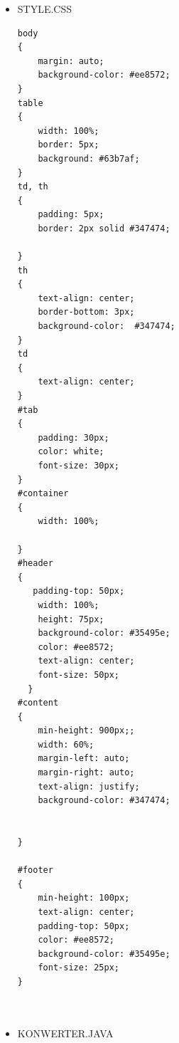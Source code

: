 \documentclass[12pt,a4paper]{article}
\begin{document}
\begin{itemize}
\begin{lstlisting}[language=Html]
                                            <td>0100010011110110</td>
                     <td>2014-7-22</td> 
                 </tr>
                 <tr>
                                            <td>0011000010010000</td>
                     <td>2004-4-16</td> 
                 </tr>
                 <tr>
                                            <td>0011001001001101</td>
                     <td>2005-2-13</td> 
                 </tr>
                 <tr>
                                            <td>0011110100011001</td>
                     <td>2010-8-25</td> 
                 </tr>
                 <tr>
                                            <td>0010110000101010</td>
                     <td>2002-1-10</td> 
                 </tr>
                 <tr>
                                            <td>0010110000101010</td>
                     <td>2002-1-10</td> 
                 </tr>
                </table>
            </div>
        <center><img src="wykres.png"></center>   </div> 
           <div id="footer"> 
                 Adam Kierat WI_DATY- Projekt Jezyki Skryptowe, 2019  
           </div> 
    </div> 
</body> 


	\end{lstlisting}
		\newpage
	\item STYLE.CSS
	\begin{lstlisting}
body
{
    margin: auto;
    background-color: #ee8572;
}
table
{
    width: 100%;
    border: 5px;
    background: #63b7af;
}
td, th
{
    padding: 5px;
    border: 2px solid #347474;

}
th
{
    text-align: center;
    border-bottom: 3px;
    background-color:  #347474;
}
td
{
    text-align: center;
}
#tab
{
    padding: 30px;
    color: white;
    font-size: 30px;
}
#container
{
    width: 100%;

}
#header
{
   padding-top: 50px;
    width: 100%;
    height: 75px;
    background-color: #35495e;
    color: #ee8572;
    text-align: center;
    font-size: 50px;
  }
#content
{
    min-height: 900px;;
    width: 60%;
    margin-left: auto;
    margin-right: auto;
    text-align: justify;
    background-color: #347474;


}

#footer
{
    min-height: 100px;
    text-align: center;
    padding-top: 50px;
    color: #ee8572;
    background-color: #35495e;
    font-size: 25px;
}



	\end{lstlisting}
\newpage
	\item KONWERTER.JAVA
	\begin{lstlisting}
	


\end{lstlisting}
\end{itemize}
\end{document}
